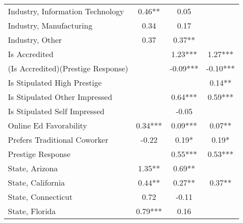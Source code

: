 {\begin{center}
{\begin{longtable}{l*{3}{c}}
            Industry, Information Technology   & 0.46**                      & 0.05                        &                             \\
            Industry, Manufacturing            & 0.34                        & 0.17                        &                             \\
            Industry, Other                    & 0.37                        & 0.37**                      &                             \\
            Is Accredited                      &                             & 1.23***                     & 1.27***                     \\
            (Is Accredited)(Prestige Response) &                             & -0.09***                    & -0.10***                    \\
            Is Stipulated High Prestige        &                             &                             & 0.14**                      \\
            Is Stipulated Other Impressed      &                             & 0.64***                     & 0.59***                     \\
            Is Stipulated Self Impressed       &                             & -0.05                       &                             \\
            Online Ed Favorability             & 0.34***                     & 0.09***                     & 0.07**                      \\
            Prefers Traditional Coworker       & -0.22                       & 0.19*                       & 0.19*                       \\
            Prestige Response                  &                             & 0.55***                     & 0.53***                     \\
            State, Arizona                     & 1.35**                      & 0.69**                      &                             \\
            State, California                  & 0.44**                      & 0.27**                      & 0.37**                      \\
            State, Connecticut                 & 0.72                        & -0.11                       &                             \\
            State, Florida                     & 0.79***                     & 0.16                        &                             \\

\end{longtable}}
\end{center}}
